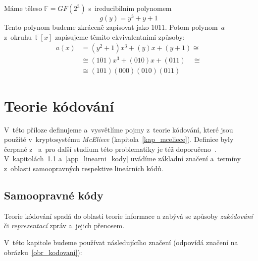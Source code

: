 \documentclass[thesis=M,czech,hidelinks]{FITthesis}[2012/06/26]
\newcommand{\0}{{\textcolor[gray]{0.75}{0}}}
\begin{document}
Máme těleso $\mathbb{F} = GF(2^3)$ s~ireducibilním polynomem
$$ g(y) = y^3 + y + 1 $$
Tento polynom budeme zkráceně zapisovat jako $1011$. Potom polynom~$a$
z~okru\-hu~$\mathbb{F}[x]$ zapisujeme těmito ekvivalentními způsoby:
\begin{align*}
    a(x) &= (y^2 + 1)x^3 + (y)x + (y+1)         \cong \\
         &\cong (101)x^3 + (010)x + (011) \quad \cong \\
         &\cong (101)(000)(010)(011)
\end{align*}





\chapter{Teorie kódování}\label{app_kodovani}

V~této příloze definujeme a~vysvětlíme pojmy z~teorie kódování, které jsou
použité v~kryptosystému \emph{McEliece} (kapitola~\ref{kap_mceliece}). Definice
byly čerpané z~\cite{FIT_AAK,Adamek} a~pro další studium této problematiky je
též doporučeno~\cite{McEliece_coding}. V~kapitolách~\ref{app_samoopravne_kody}
a~\ref{app_linearni_kody} uvádíme základní značení a~termíny z~oblasti
samoopravných respektive lineárních kódů.



\section{Samoopravné kódy}\label{app_samoopravne_kody}

Teorie kódování spadá do oblasti teorie informace a zabývá se způsoby
\emph{zakódování} či \emph{reprezentací} zpráv a~jejich přenosem.

V~této kapitole budeme používat následujícího značení (odpovídá značení na
obrázku~\ref{obr_kodovani}):
\end{document}
